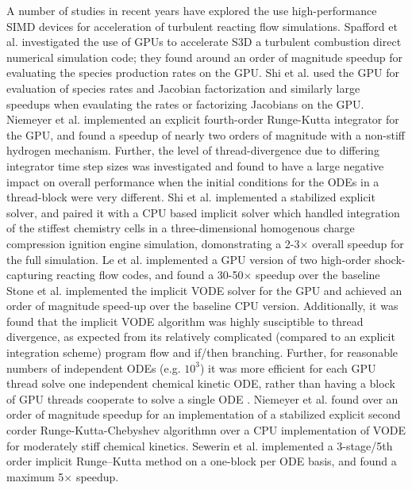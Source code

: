 \documentclass[preprint,12pt]{elsarticle}
\begin{document}
A number of studies in recent years have explored the use high-performance SIMD devices for acceleration of turbulent reacting flow simulations.
Spafford et al. \cite{Spafford:2010aa} investigated the use of GPUs to accelerate S3D \cite{CHEN:2009s3d} a turbulent combustion direct numerical simulation code; they found around an order of magnitude speedup for evaluating the species production rates on the GPU.
Shi et al. \cite{Shi:2011aa} used the GPU for evaluation of species rates and Jacobian factorization and similarly large speedups when evaulating the rates or factorizing Jacobians on the GPU.
Niemeyer et al. \cite{Niemeyer:2011aa} implemented an explicit fourth-order Runge-Kutta integrator for the GPU, and found a speedup of nearly two orders of magnitude with a non-stiff hydrogen mechanism.
Further, the level of thread-divergence due to differing integrator time step sizes was investigated and found to have a large negative impact on overall performance when the initial conditions for the ODEs in a thread-block were very different.
Shi et al. \cite{Shi:2012aa} implemented a stabilized explicit solver, and paired it with a CPU based implicit solver which handled integration of the stiffest chemistry cells in a three-dimensional homogenous charge compression ignition engine simulation, domonstrating a 2-3$\times$ overall speedup for the full simulation.
Le et al. \cite{Le2013596} implemented a GPU version of two high-order shock-capturing reacting flow codes, and found a 30-50$\times$ speedup over the baseline 
Stone et al. \cite{Stone:2013aa} implemented the implicit VODE \cite{brown1989vode} solver for the GPU and achieved an order of magnitude speed-up over the baseline CPU version.
Additionally, it was found that the implicit VODE algorithm was highly susciptible to thread divergence, as expected from its relatively complicated (compared to an explicit integration scheme) program flow and if/then branching.
Further, for reasonable numbers of independent ODEs (e.g. $\mathcal{10^3}$) it was more efficient for each GPU thread solve one independent chemical kinetic ODE, rather than having a block of GPU threads cooperate to solve a single ODE \cite{Stone:2013aa}.
Niemeyer et al. \cite{Niemeyer:2014aa} found over an order of magnitude speedup for an implementation of a stabilized explicit second corder Runge-Kutta-Chebyshev algorithmn over a CPU implementation of VODE for moderately stiff chemical kinetics.
Sewerin et al. \cite{Sewerin20151375} implemented a 3-stage/5th order implicit Runge--Kutta method on a one-block per ODE basis, and found a maximum 5$\times$ speedup.
\end{document}

